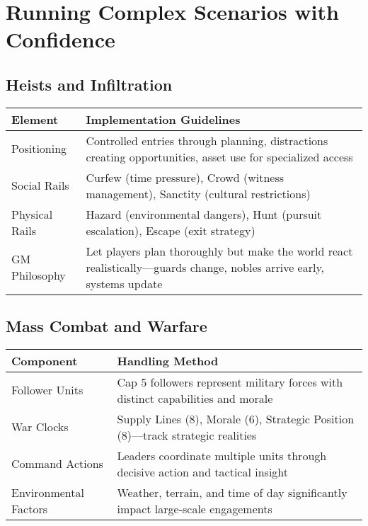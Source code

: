 \section*{Running Complex Scenarios with Confidence}

\subsection*{Heists and Infiltration}

\begin{fatebox}
\begin{tabularx}{\textwidth}{lX}
\toprule
\textbf{Element} & \textbf{Implementation Guidelines} \\
\midrule
Positioning & Controlled entries through planning, distractions creating opportunities, asset use for specialized access \\
Social Rails & Curfew (time pressure), Crowd (witness management), Sanctity (cultural restrictions) \\
Physical Rails & Hazard (environmental dangers), Hunt (pursuit escalation), Escape (exit strategy) \\
GM Philosophy & Let players plan thoroughly but make the world react realistically---guards change, nobles arrive early, systems update \\
\bottomrule
\end{tabularx}
\end{fatebox}

\subsection*{Mass Combat and Warfare}

\begin{fatebox}
\begin{tabularx}{\textwidth}{lX}
\toprule
\textbf{Component} & \textbf{Handling Method} \\
\midrule
Follower Units & Cap 5 followers represent military forces with distinct capabilities and morale \\
War Clocks & Supply Lines (8), Morale (6), Strategic Position (8)---track strategic realities \\
Command Actions & Leaders coordinate multiple units through decisive action and tactical insight \\
Environmental Factors & Weather, terrain, and time of day significantly impact large-scale engagements \\
\bottomrule
\end{tabularx}
\end{fatebox}

